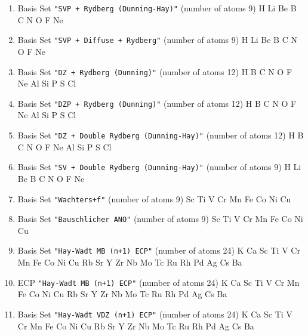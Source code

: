 \begin{enumerate}
\item Basis Set \verb#"SVP + Rydberg (Dunning-Hay)"# (number of atoms 9) \newline
  H Li Be B C N O F Ne


\item Basis Set \verb#"SVP + Diffuse + Rydberg"# (number of atoms 9) \newline
  H Li Be B C N O F Ne


\item Basis Set \verb#"DZ + Rydberg (Dunning)"# (number of atoms 12) \newline
  H B C N O F Ne Al Si P S Cl


\item Basis Set \verb#"DZP + Rydberg (Dunning)"# (number of atoms 12) \newline
  H B C N O F Ne Al Si P S Cl


\item Basis Set \verb#"DZ + Double Rydberg (Dunning-Hay)"# (number of atoms 12) \newline
  H B C N O F Ne Al Si P S Cl


\item Basis Set \verb#"SV + Double Rydberg (Dunning-Hay)"# (number of atoms 9) \newline
  H Li Be B C N O F Ne


\item Basis Set \verb#"Wachters+f"# (number of atoms 9) \newline
  Sc Ti V Cr Mn Fe Co Ni Cu


\item Basis Set \verb#"Bauschlicher ANO"# (number of atoms 9) \newline
  Sc Ti V Cr Mn Fe Co Ni Cu


\item Basis Set \verb#"Hay-Wadt MB (n+1) ECP"# (number of atoms 24) \newline
  K Ca Sc Ti V Cr Mn Fe Co Ni Cu Rb Sr Y Zr Nb Mo Tc Ru Rh Pd Ag Cs Ba


\item ECP \verb#"Hay-Wadt MB (n+1) ECP"# (number of atoms 24) \newline
  K Ca Sc Ti V Cr Mn Fe Co Ni Cu Rb Sr Y Zr Nb Mo Tc Ru Rh Pd Ag Cs Ba


\item Basis Set \verb#"Hay-Wadt VDZ (n+1) ECP"# (number of atoms 24) \newline
  K Ca Sc Ti V Cr Mn Fe Co Ni Cu Rb Sr Y Zr Nb Mo Tc Ru Rh Pd Ag Cs Ba



\end{enumerate}

